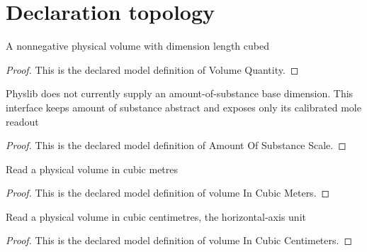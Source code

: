 \section{Declaration topology}
\begin{definition}
  \label{def:physics:phyx-mini-0361:phyxminiproblems-problemphyxmini0361-volumequantity}
  A nonnegative physical volume with dimension length cubed
\end{definition}
\begin{proof}
  This is the declared model definition of Volume Quantity.
\end{proof}
\begin{definition}
  \label{def:physics:phyx-mini-0361:phyxminiproblems-problemphyxmini0361-amountofsubstancescale}
  Physlib does not currently supply an amount-of-substance base dimension. This interface keeps amount of substance abstract and exposes only its calibrated mole readout
\end{definition}
\begin{proof}
  This is the declared model definition of Amount Of Substance Scale.
\end{proof}
\begin{definition}
  \label{def:physics:phyx-mini-0361:phyxminiproblems-problemphyxmini0361-volumeincubicmeters}
  Read a physical volume in cubic metres
\end{definition}
\begin{proof}
  This is the declared model definition of volume In Cubic Meters.
\end{proof}
\begin{definition}
  \label{def:physics:phyx-mini-0361:phyxminiproblems-problemphyxmini0361-volumeincubiccentimeters}
  Read a physical volume in cubic centimetres, the horizontal-axis unit
\end{definition}
\begin{proof}
  This is the declared model definition of volume In Cubic Centimeters.
\end{proof}
